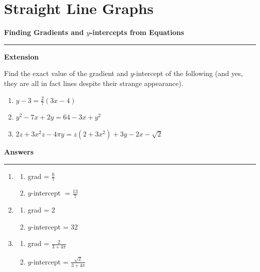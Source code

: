 \documentclass{article}
\begin{document}
\newpage

\section{Straight Line Graphs}
\newpage 
\noindent \textbf{Finding Gradients and \(y\)-intercepts from Equations}
\medskip
\hrule
\medskip
\noindent \textbf{Extension} 

\medskip

Find the exact value of the gradient and \(y\)-intercept of the following (and yes, they are all in fact lines despite their strange appearance).

\begin{enumerate}
    \item \(y-3 = \frac{2}{7}(3x-4)\)
    \item \(y^2-7x+2y = 64 - 3x +y^2 \)
    \item \(2z + 3x^2z - 4\pi y = z(2+3x^2) +3y - 2x -\sqrt{2}\)
\end{enumerate}



\newpage

\noindent \textbf{Answers}

\medskip

\hrule

\medskip

\begin{enumerate}
    \item \begin{enumerate}
        \item grad = \(\frac{6}{7}\)
        \item \(y\)-intercept \(= \frac{13}{7}\)
    \end{enumerate}
    \item \begin{enumerate}
        \item grad = \(2\)
        \item \(y\)-intercept = 32
    \end{enumerate}
    \item \begin{enumerate}
        \item grad = \(\frac{2}{3+4\pi}\)
        \item \(y\)-intercept = \(\frac{\sqrt{2}}{3+4\pi}\)
    \end{enumerate}
\end{enumerate}
\end{document}
